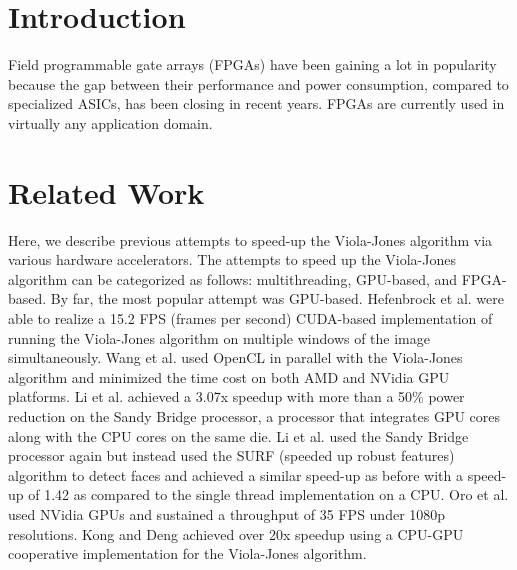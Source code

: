 \documentclass[conference]{IEEEtran}
\begin{document}
\IEEEpeerreviewmaketitle



\section {Introduction}


Field programmable gate arrays (FPGAs) have been gaining a lot in popularity because the gap between their performance and power consumption, compared to specialized ASICs, has been closing in recent years.
FPGAs are currently used in virtually any application domain.




\section {Related Work}

Here, we describe previous attempts to speed-up the Viola-Jones algorithm via various hardware accelerators.  The attempts to speed up the Viola-Jones algorithm can be categorized as follows: multithreading, GPU-based, and FPGA-based.  By far, the most popular attempt was GPU-based.  Hefenbrock et al. \cite{hefenbrock-2010} were able to realize a 15.2 FPS (frames per second) CUDA-based implementation of running the Viola-Jones algorithm on multiple windows of the image simultaneously.  Wang et al. \cite{wang-2012} used OpenCL in parallel with the Viola-Jones algorithm and minimized the time cost on both AMD and NVidia GPU platforms.  Li et al. \cite{ligpu-2012} achieved a 3.07x speedup with more than a 50\% power reduction on the Sandy Bridge processor, a processor that integrates GPU cores along with the CPU cores on the same die. Li et al. \cite{lisurf-2012} used the Sandy Bridge processor again but instead used the SURF (speeded up robust features) algorithm to detect faces and achieved a similar speed-up as before with a speed-up of 1.42 as compared to the single thread implementation on a CPU.  Oro et al. \cite{oro-2011} used NVidia GPUs and sustained a throughput of 35 FPS under 1080p resolutions.  Kong and Deng \cite{kong-2010} achieved over 20x speedup using a CPU-GPU cooperative implementation for the Viola-Jones algorithm.
\end{document}

